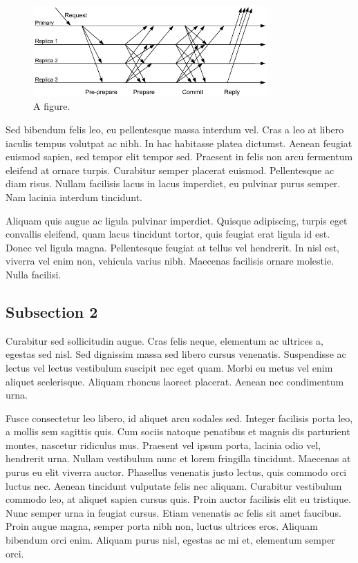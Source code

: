 \documentclass[11pt]{article}
\begin{document}
\begin{figure}[h]
   \centering
       \includegraphics[width=0.8\textwidth]{protocol}
   \caption{A figure.}
\end{figure}

 Sed bibendum felis leo, eu pellentesque massa interdum vel. Cras a leo at libero iaculis tempus volutpat ac nibh. In hac habitasse platea dictumst. Aenean feugiat euismod sapien, sed tempor elit tempor sed. Praesent in felis non arcu fermentum eleifend at ornare turpis. Curabitur semper placerat euismod. Pellentesque ac diam risus. Nullam facilisis lacus in lacus imperdiet, eu pulvinar purus semper. Nam lacinia interdum tincidunt. 

 Aliquam quis augue ac ligula pulvinar imperdiet. Quisque adipiscing, turpis eget convallis eleifend, quam lacus tincidunt tortor, quis feugiat erat ligula id est. Donec vel ligula magna. Pellentesque feugiat at tellus vel hendrerit. In nisl est, viverra vel enim non, vehicula varius nibh. Maecenas facilisis ornare molestie. Nulla facilisi.
 
 \subsection{Subsection 2}
 Curabitur sed sollicitudin augue. Cras felis neque, elementum ac ultrices a, egestas sed nisl. Sed dignissim massa sed libero cursus venenatis. Suspendisse ac lectus vel lectus vestibulum suscipit nec eget quam. Morbi eu metus vel enim aliquet scelerisque. Aliquam rhoncus laoreet placerat. Aenean nec condimentum urna. 

 Fusce consectetur leo libero, id aliquet arcu sodales sed. Integer facilisis porta leo, a mollis sem sagittis quis. Cum sociis natoque penatibus et magnis dis parturient montes, nascetur ridiculus mus. Praesent vel ipsum porta, lacinia odio vel, hendrerit urna. Nullam vestibulum nunc et lorem fringilla tincidunt. Maecenas at purus eu elit viverra auctor. Phasellus venenatis justo lectus, quis commodo orci luctus nec. Aenean tincidunt vulputate felis nec aliquam. Curabitur vestibulum commodo leo, at aliquet sapien cursus quis. Proin auctor facilisis elit eu tristique. Nunc semper urna in feugiat cursus. Etiam venenatis ac felis sit amet faucibus. Proin augue magna, semper porta nibh non, luctus ultrices eros. Aliquam bibendum orci enim. Aliquam purus nisl, egestas ac mi et, elementum semper orci. 
\end{document}
